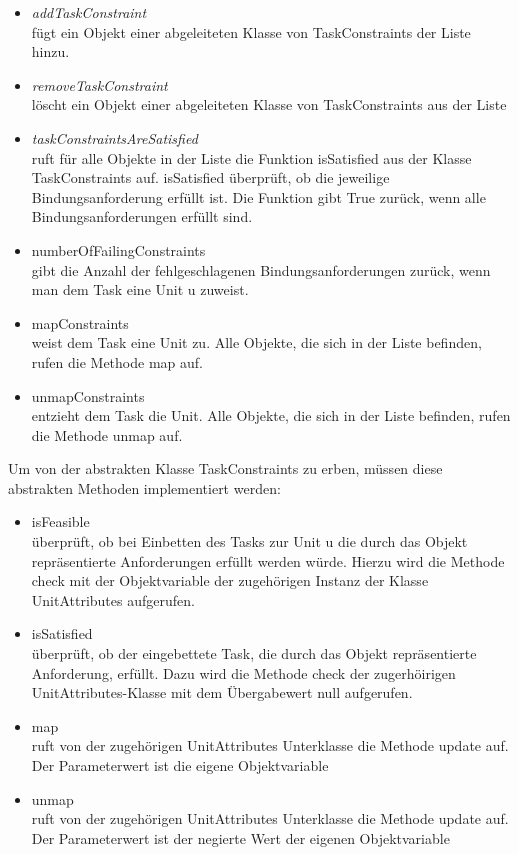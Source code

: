 \begin{itemize}
\item \textit{addTaskConstraint}\\
fügt ein Objekt einer abgeleiteten Klasse von TaskConstraints der Liste hinzu. 
\item \textit{removeTaskConstraint}\\
löscht ein Objekt einer abgeleiteten Klasse von TaskConstraints aus der Liste
\item \textit{taskConstraintsAreSatisfied}\\
ruft für alle Objekte in der Liste die Funktion isSatisfied aus der Klasse TaskConstraints auf. isSatisfied überprüft, ob die jeweilige Bindungsanforderung erfüllt ist. Die Funktion gibt True zurück, wenn alle Bindungsanforderungen erfüllt sind.%
\item numberOfFailingConstraints\\
gibt die Anzahl der fehlgeschlagenen Bindungsanforderungen zurück, wenn man dem Task eine Unit u zuweist. 
\item mapConstraints\\
weist dem Task eine Unit zu. Alle Objekte, die sich in der Liste befinden, rufen die Methode map auf.
\item unmapConstraints\\
entzieht dem Task die Unit. Alle Objekte, die sich in der Liste befinden, rufen die Methode unmap auf.
\end{itemize}

Um von der abstrakten Klasse TaskConstraints zu erben, müssen diese abstrakten Methoden implementiert werden:\\
\begin{itemize}
\item isFeasible\\
überprüft, ob bei Einbetten des Tasks zur Unit u die durch das Objekt repräsentierte Anforderungen erfüllt werden würde. Hierzu wird die Methode check mit der Objektvariable der zugehörigen Instanz der Klasse UnitAttributes aufgerufen. 
\item isSatisfied\\
überprüft, ob der eingebettete Task, die durch das Objekt repräsentierte Anforderung, erfüllt. Dazu wird die Methode check der zugerhöirigen UnitAttributes-Klasse mit dem Übergabewert null aufgerufen. 
\item map \\
ruft von der zugehörigen UnitAttributes Unterklasse die Methode update auf. Der Parameterwert ist die eigene Objektvariable
\item unmap\\
ruft von der zugehörigen UnitAttributes Unterklasse die Methode update auf. Der Parameterwert ist der negierte Wert der eigenen Objektvariable
\end{itemize}

